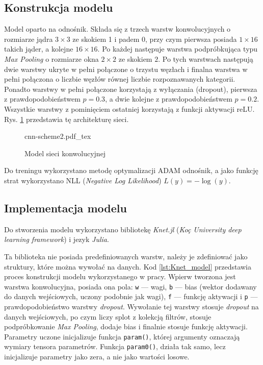 \documentclass[pl,12pt]{aghdpl}
\let\Oldsubsection\subsection%
\renewcommand{\subsection}{\FloatBarrier\Oldsubsection}
\begin{document}
\subsection{Konstrukcja modelu}
Model oparto na {\color{red}odnośnik}. Składa się z trzech warstw
konwolucyjnych o rozmiarze jądra $3 \times 3$ ze skokiem 1 i padem 0, przy czym
pierwsza posiada $1 \times 16$ takich jąder, a kolejne $16\times 16$. Po każdej
następuje warstwa podpróbkująca typu \textit{Max Pooling} o rozmiarze okna $2
\times 2$ ze skokiem $2$. Po tych warstwach następują dwie warstwy ukryte w
pełni połączone o trzystu węzłach i finalna warstwa w pełni połączona o liczbie
węzłów równej liczbie rozpoznawanych kategorii.  Ponadto warstwy w pełni
połączone korzystają z wyłączania (dropout), pierwsza z prawdopodobieństwem $p
= 0.3$, a dwie kolejne z prawdopodobieństwem $p = 0.2$.  Wszystkie warstwy z
pominięciem ostatniej korzystają z funkcji aktywacji reLU.  Rys.
\ref{fig:cnn_scheme} przedstawia tę architekturę sieci.
\begin{figure}[!tbh]
  \centering
  \scriptsize{cnn-scheme2.pdf_tex}
  \caption{Model sieci konwolucyjnej}
  \label{fig:cnn_scheme}
\end{figure}

Do treningu wykorzystano metodę optymalizacji ADAM {\color{red}odnośnik}, a
jako funkcję strat wykorzystano NLL (\textit{Negative Log Likelihood}) $L(y) =
-\log(y)$.
\subsection{Implementacja modelu}
Do stworzenia modelu wykorzystano bibliotekę \textit{Knet.jl} (\textit{Koç
University deep learning framework}) i jezyk \textit{Julia}.

Ta biblioteka nie posiada predefiniowanych warstw, należy je zdefiniować
jako struktury, które można wywołać na danych. Kod \ref{lst:Knet_model}
przedstawia proces konstrukcji modelu wykorzystanego w pracy. Wpierw tworzona
jest warstwa konwolucyjna, posiada ona pola: \lstinline|w| --- wagi,
\lstinline|b| --- bias (wektor dodawany do danych wejściowych, uczony podobnie
jak wagi), \lstinline|f| --- funkcję aktywacji i \lstinline|p| ---
prawdopodobieństwo warstwy \textit{dropout}. Wywołanie tej warstwy stosuje
\textit{dropout} na danych wejściowych, po czym liczy splot z kolekcją filtrów,
stosuje podpróbkowanie \textit{Max Pooling}, dodaje bias i finalnie stosuje
funkcję aktywacji. Parametry uczone inicjalizuje funkcja \lstinline|param()|,
której argumenty oznaczają wymiary tensora parametrów. Funkcja
\lstinline|param0()|, działa tak samo, lecz inicjalizuje parametry jako zera, a
nie jako wartości losowe.
\end{document}
